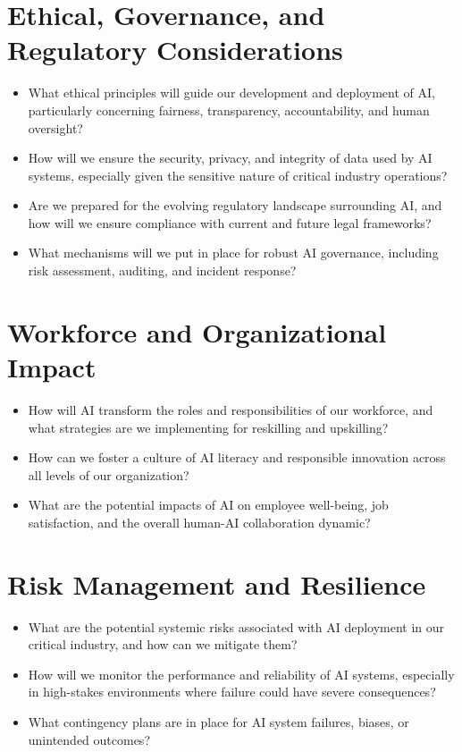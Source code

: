 \section*{Ethical, Governance, and Regulatory Considerations}
\begin{itemize}
    \item What ethical principles will guide our development and deployment of AI, particularly concerning fairness, transparency, accountability, and human oversight?
    \item How will we ensure the security, privacy, and integrity of data used by AI systems, especially given the sensitive nature of critical industry operations?
    \item Are we prepared for the evolving regulatory landscape surrounding AI, and how will we ensure compliance with current and future legal frameworks?
    \item What mechanisms will we put in place for robust AI governance, including risk assessment, auditing, and incident response?
\end{itemize}

\section*{Workforce and Organizational Impact}
\begin{itemize}
    \item How will AI transform the roles and responsibilities of our workforce, and what strategies are we implementing for reskilling and upskilling?
    \item How can we foster a culture of AI literacy and responsible innovation across all levels of our organization?
    \item What are the potential impacts of AI on employee well-being, job satisfaction, and the overall human-AI collaboration dynamic?
\end{itemize}

\section*{Risk Management and Resilience}
\begin{itemize}
    \item What are the potential systemic risks associated with AI deployment in our critical industry, and how can we mitigate them?
    \item How will we monitor the performance and reliability of AI systems, especially in high-stakes environments where failure could have severe consequences?
    \item What contingency plans are in place for AI system failures, biases, or unintended outcomes?
\end{itemize}

